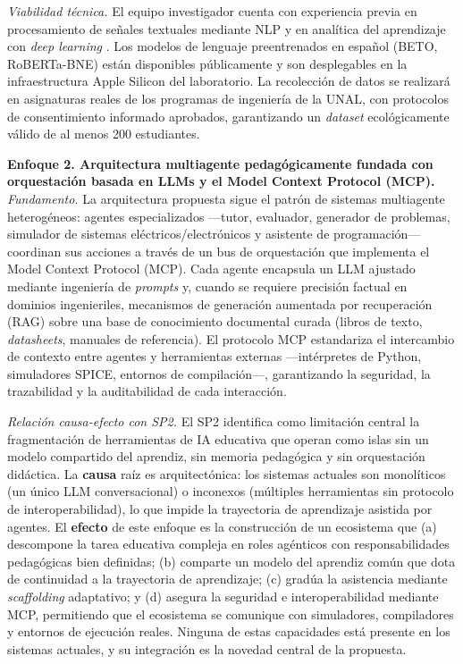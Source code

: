 \emph{Viabilidad técnica.}
El equipo investigador cuenta con experiencia previa en procesamiento de señales
textuales mediante NLP y en analítica del aprendizaje con \emph{deep learning}
\cite{escamilla2022artificial}. Los modelos de lenguaje preentrenados en español
(BETO, RoBERTa-BNE) están disponibles públicamente y son desplegables en la
infraestructura Apple Silicon del laboratorio. La recolección de datos se realizará
en asignaturas reales de los programas de ingeniería de la UNAL, con protocolos de
consentimiento informado aprobados, garantizando un \emph{dataset} ecológicamente
válido de al menos 200 estudiantes.

\medskip

\noindent\textbf{Enfoque 2. Arquitectura multiagente pedagógicamente fundada con
orquestación basada en LLMs y el Model Context Protocol (MCP).}
\emph{Fundamento.}
La arquitectura propuesta sigue el patrón de sistemas multiagente heterogéneos:
agentes especializados —tutor, evaluador, generador de problemas, simulador de
sistemas eléctricos/electrónicos y asistente de programación— coordinan sus acciones
a través de un bus de orquestación que implementa el Model Context Protocol (MCP).
Cada agente encapsula un LLM ajustado mediante ingeniería de \emph{prompts} y,
cuando se requiere precisión factual en dominios ingenieriles, mecanismos de
generación aumentada por recuperación (RAG) sobre una base de conocimiento
documental curada (libros de texto, \emph{datasheets}, manuales de referencia). El
protocolo MCP estandariza el intercambio de contexto entre agentes y herramientas
externas —intérpretes de Python, simuladores SPICE, entornos de compilación—,
garantizando la seguridad, la trazabilidad y la auditabilidad de cada interacción.

\emph{Relación causa-efecto con SP2.}
El SP2 identifica como limitación central la fragmentación de herramientas de IA
educativa que operan como islas sin un modelo compartido del aprendiz, sin memoria
pedagógica y sin orquestación didáctica. La \textbf{causa} raíz es arquitectónica:
los sistemas actuales son monolíticos (un único LLM conversacional) o inconexos
(múltiples herramientas sin protocolo de interoperabilidad), lo que impide la
trayectoria de aprendizaje asistida por agentes. El \textbf{efecto} de este enfoque
es la construcción de un ecosistema que (a) descompone la tarea educativa compleja
en roles agénticos con responsabilidades pedagógicas bien definidas; (b) comparte un
modelo del aprendiz común que dota de continuidad a la trayectoria de aprendizaje;
(c) gradúa la asistencia mediante \emph{scaffolding} adaptativo; y (d) asegura la
seguridad e interoperabilidad mediante MCP, permitiendo que el ecosistema se
comunique con simuladores, compiladores y entornos de ejecución reales. Ninguna de
estas capacidades está presente en los sistemas actuales, y su integración es la
novedad central de la propuesta.

